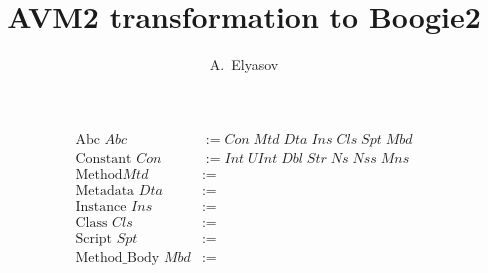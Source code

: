 \documentclass[12pt]{article}
\title{AVM2 transformation to Boogie2}
\author{A.~Elyasov}
\begin{document}
\maketitle


\begin{align*}
\text{Abc }          Abc &:= Con \; Mtd \; Dta \; Ins \; Cls \; Spt \; Mbd\\
\text{Constant }     Con &:= Int \; UInt \; Dbl \; Str \; Ns \; Nss \; Mns\\
\text{Method}        Mtd &:= \\
\text{Metadata }     Dta &:= \\
\text{Instance }     Ins &:= \\
\text{Class }        Cls &:= \\
\text{Script }       Spt &:= \\
\text{Method\_Body } Mbd &:= 
\end{align*}
\end{document}
